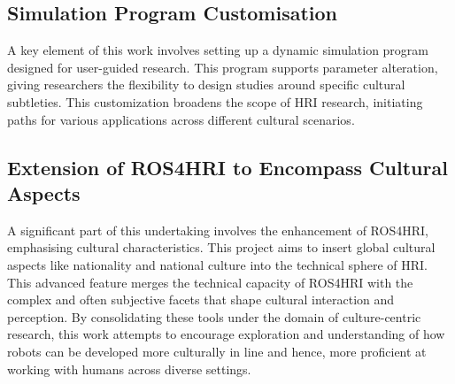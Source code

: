 \subsection{Simulation Program Customisation}

A key element of this work involves setting up a dynamic simulation program designed for user-guided research. This program supports parameter alteration, giving researchers the flexibility to design studies around specific cultural subtleties. This customization broadens the scope of HRI research, initiating paths for various applications across different cultural scenarios.

\subsection{Extension of ROS4HRI to Encompass Cultural Aspects}

A significant part of this undertaking involves the enhancement of ROS4HRI, emphasising cultural characteristics. This project aims to insert global cultural aspects like nationality and national culture into the technical sphere of HRI. This advanced feature merges the technical capacity of ROS4HRI with the complex and often subjective facets that shape cultural interaction and perception.
By consolidating these tools under the domain of culture-centric research, this work attempts to encourage exploration and understanding of how robots can be developed more culturally in line and hence, more proficient at working with humans across diverse settings.